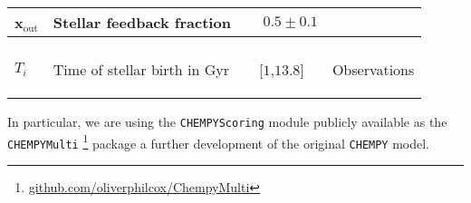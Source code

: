 \documentclass{aa}
\begin{document}
\begin{tiny}
\begin{table*}
\begin{minipage}{\textwidth}
\begin{center}
\begin{tabularx}{\textwidth}{ >{\raggedleft}p{2.2cm}p{6.5cm}|c c }
x$_\mathrm{out}$ & Stellar feedback fraction & $\phantom{-}0.5\pm0.1$ & \citep[Tab.\,1]{Rybizki_2017}\\
  
\hline
\multicolumn{4}{c}{$T_i$: \textit{Timescale}}\\
 
\hline
$T_i$ & Time of stellar birth in Gyr & [$1$,$13.8$] & Observations

\label{tab:priors}
\end{tabularx}
\end{center}
\end{minipage}
\end{table*}
\end{tiny}

In particular, we are using the \texttt{CHEMPYScoring} module \citep{Philcox_2018} publicly available as the \texttt{CHEMPYMulti} \citep{Philcox_2019}\footnote{\href{https://github.com/oliverphilcox/ChempyMulti}{github.com/oliverphilcox/ChempyMulti}} package a further development of the original \texttt{CHEMPY} model. 
\end{document}
